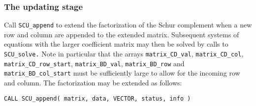\documentclass{galahad}
\newcommand{\packagename}{SCU}
\begin{document}

\subsubsection{The updating stage}
Call {\tt \packagename\_append} to extend the factorization of the Schur
complement when a new row and column are appended to the
extended matrix. Subsequent systems of equations with the larger
coefficient matrix may then be solved by calls to {\tt \packagename\_solve.}
Note in particular that the arrays {\tt matrix\_CD\_val},
{\tt matrix\_CD\_col}, {\tt matrix\_CD\_row\_start}, {\tt matrix\_BD\_val},
{\tt matrix\_BD\_row} and {\tt matrix\_BD\_col\_start}
must be sufficiently large to allow for the incoming row and column.
The factorization may be extended as follows:
\vspace*{1mm}

\hskip0.5in
{\tt CALL \packagename\_append( matrix, data, VECTOR, status, info )}
\end{document}
